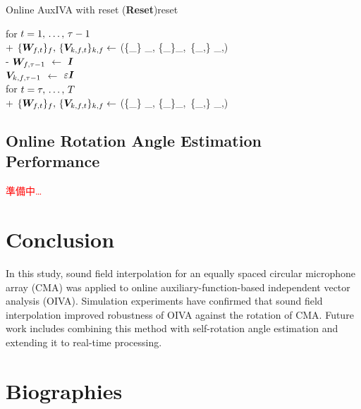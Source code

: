 \documentclass[sip,biber]{now-journal}
\newcommand{\todo}[1]{\textcolor{red}{#1}}
\begin{document}
\begin{algorithm}{Online AuxIVA with reset (\textbf{Reset})}{reset}
  \begin{pseudo}
    for $t = 1,\, \dots,\, \tau - 1$ \\+
      $\{\Demix _{\ft}\}_{\freq},\, \{\cov _{\src,\ft}\} _{\src,\freq} \gets$ (\{\Obs _{\ft}\} _{\freq}, \{\Demix _{\ft[-1]}\}_{\freq},\, \{\cov _{\src,\ft[-1]}\} _{\src,\freq}) \\-
    {$\bm{W} _{f,\tau - 1}$} $\gets$ $\bm{I}$ \ct{$(\forall \freq)$} \\
    {$\bm{V} _{k,f,\tau - 1}$} $\gets$ $\varepsilon \bm{I}$ \ct{$(\forall \src,\freq)$} \\
    for $t = \tau,\, \dots,\, T$ \\+
      $\{\Demix _{\ft}\}_{\freq},\, \{\cov _{\src,\ft}\} _{\src,\freq} \gets$ (\{\Obs _{\ft}\} _{\freq}, \{\Demix _{\ft[-1]}\}_{\freq},\, \{\cov _{\src,\ft[-1]}\} _{\src,\freq})
  \end{pseudo}
\end{algorithm}

\subsection{Online Rotation Angle Estimation Performance}
\todo{準備中…}

\section{Conclusion}\label{sec:conclusion}
In this study, sound field interpolation for an equally spaced circular microphone array (CMA) was applied to online auxiliary-function-based independent vector analysis (OIVA).
Simulation experiments have confirmed that sound field interpolation improved robustness of OIVA against the rotation of CMA.
Future work includes combining this method with self-rotation angle estimation \cite{Lian:2021:APSIPA} and extending it to real-time processing.

\section*{Biographies}
\end{document}
